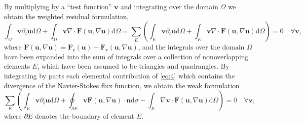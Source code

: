 \documentclass{develop-note}
\begin{document}
By multiplying by a ``test function'' $\mathbf{v}$ and integrating over the domain $\Omega$ we obtain the weighted residual formulation,
\begin{equation}
  \label{eq:4}
  \int_{\Omega}\mathbf{v}\partial_{t}\mathbf{u}\mathrm{d}\Omega+\int_{\Omega}\mathbf{v}\nabla\cdot\mathbf{F}(\mathbf{u},\nabla\mathbf{u})\mathrm{d}\Omega=\sum_{E}\left(\int_{E}\mathbf{v}\partial_{t}\mathbf{u}\mathrm{d}\Omega+\int_{E}\mathbf{v}\nabla\cdot\mathbf{F}(\mathbf{u},\nabla\mathbf{u})\mathrm{d}\Omega\right)=0\quad\forall\mathbf{v},
\end{equation}
where $\mathbf{F}(\mathbf{u},\nabla\mathbf{u})=\mathbf{F}_{\mathrm{e}}(\mathbf{u})-\mathbf{F}_{\mathrm{v}}(\mathbf{u},\nabla\mathbf{u})$, and the integrals over the domain $\Omega$ have been expanded into the sum of integrals over a collection of nonoverlapping elements ${E}$, which have been assumed to be triangles and quadrangles. By integrating by parts each elemental contribution of \autoref{eq:4} which contains the divergence of the Navier-Stokes flux function, we obtain the weak formulation
\begin{equation}
  \label{eq:5}
  \sum_{E}\left(\int_{E}\mathbf{v}\partial_{t}\mathbf{u}\mathrm{d}\Omega+\oint_{\partial E}\mathbf{v}\mathbf{F}(\mathbf{u},\nabla\mathbf{u})\cdot\mathbf{n}\mathrm{d}\sigma-\int_{E}\nabla\mathbf{v}\cdot\mathbf{F}(\mathbf{u},\nabla\mathbf{u})\mathrm{d}\Omega\right)=0\quad\forall\mathbf{v},
\end{equation}
where $\partial E$ denotes the boundary of element $E$.
\end{document}
